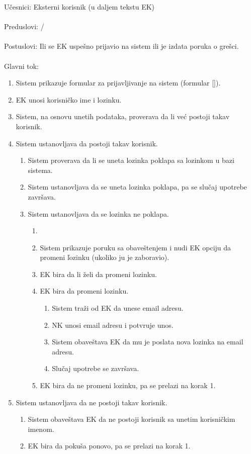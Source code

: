 \noindent U\v cesnici: Eksterni korisnik (u daljem tekstu EK)
\\
\\ Preduslovi: /
\\
\\ Postuslovi: Ili se EK uspe\v sno prijavio na sistem ili je izdata poruka o gre\v sci.
\\ 
\\ Glavni tok:
\begin{enumerate}
	\item Sistem prikazuje formular za prijavljivanje na sistem (formular \ref{}).
	\item EK unosi korisni\v cko ime i lozinku.
	\item Sistem, na osnovu unetih podataka, proverava da li ve\'c postoji takav korisnik.
	\item Sistem ustanovljava da postoji takav korisnik.
	\begin{enumerate}
		\item Sistem proverava da li se uneta lozinka poklapa sa lozinkom u bazi sistema.
		\item Sistem ustanovljava da se uneta lozinka poklapa, pa se slu\v caj upotrebe zavr\v sava.
		\item Sistem ustanovljava da se lozinka ne poklapa.
		\begin{enumerate}
			\item \item Sistem prikazuje poruku sa obave\v stenjem i nudi EK opciju da promeni \v lozinku (ukoliko ju je zaboravio).
			\item EK bira da li \v zeli da promeni lozinku.
			\item EK bira da promeni lozinku.
			\begin{enumerate}
				\item Sistem tra\v zi od EK da unese email adresu.
				\item NK unosi email adresu i potvr\dj uje unos.
				\item Sistem obave\v stava EK da mu je poslata nova lozinka na email adresu.
				\item Slu\v caj upotrebe se zavr\v sava.
			\end{enumerate}
			\item EK bira da ne promeni lozinku, pa se prelazi na korak 1.
		\end{enumerate}
	\end{enumerate}
	\item Sistem ustanovljava da ne postoji takav korisnik.
	\begin{enumerate}
		\item Sistem obave\v stava EK da ne postoji korisnik sa unetim korisni\v ckim imenom.
		\item EK bira da poku\v sa ponovo, pa se prelazi na korak 1.
	\end{enumerate}
\end{enumerate}

